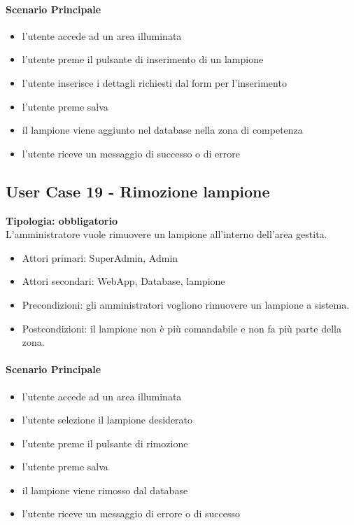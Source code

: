 \documentclass[12pt]{article}
\begin{document}
\paragraph{Scenario Principale}
\begin{itemize}
	\item l'utente accede ad un area illuminata
	\item l'utente preme il pulsante di inserimento di un lampione
	\item l'utente inserisce i dettagli richiesti dal form per l'inserimento
	\item l'utente preme salva
	\item il lampione viene aggiunto nel database nella zona di competenza
	\item l'utente riceve un messaggio di successo o di errore
\end{itemize}

\subsection{User Case 19 - Rimozione lampione}
\textbf{Tipologia: obbligatorio}\\
L'amministratore vuole rimuovere un lampione all'interno dell'area gestita.
\begin{itemize}
	\item Attori primari: SuperAdmin, Admin
	\item Attori secondari: WebApp, Database, lampione
	\item Precondizioni: gli amministratori vogliono rimuovere un lampione a sistema.\\
	\item Postcondizioni: il lampione non è più comandabile e non fa più parte della zona.
\end{itemize}
\paragraph{Scenario Principale}
\begin{itemize}
	\item l'utente accede ad un area illuminata
	\item l'utente selezione il lampione desiderato
	\item l'utente preme il pulsante di rimozione
	\item l'utente preme salva
	\item il lampione viene rimosso dal database
	\item l'utente riceve un messaggio di errore o di successo
\end{itemize}
\end{document}
